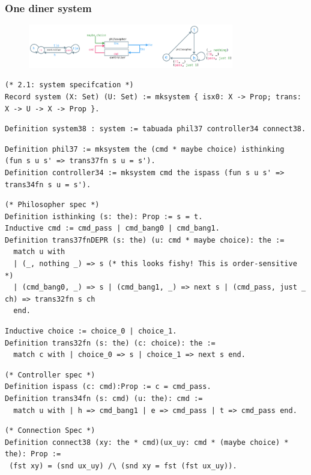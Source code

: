 \documentclass{beamer}
\begin{document}
\begin{frame}[fragile]
\frametitle{One diner system}

\begin{figure}\centering
\includegraphics[width=0.8\textwidth]{transitions-combined.png}
\end{figure}
\pause
{\tiny
\begin{verbatim}
(* 2.1: system specifcation *)
Record system (X: Set) (U: Set) := mksystem { isx0: X -> Prop; trans: X -> U -> X -> Prop }.
\end{verbatim}
\pause
\begin{verbatim}
Definition system38 : system := tabuada phil37 controller34 connect38.
\end{verbatim}
\pause

\begin{verbatim}
Definition phil37 := mksystem the (cmd * maybe choice) isthinking  (fun s u s' => trans37fn s u = s').
Definition controller34 := mksystem cmd the ispass (fun s u s' => trans34fn s u = s').
\end{verbatim}
\pause
\begin{verbatim}
(* Philosopher spec *)
Definition isthinking (s: the): Prop := s = t.
Inductive cmd := cmd_pass | cmd_bang0 | cmd_bang1.
Definition trans37fnDEPR (s: the) (u: cmd * maybe choice): the :=
  match u with
  | (_, nothing _) => s (* this looks fishy! This is order-sensitive *)
  | (cmd_bang0, _) => s | (cmd_bang1, _) => next s | (cmd_pass, just _ ch) => trans32fn s ch
  end.
\end{verbatim}
\pause
\begin{verbatim}
Inductive choice := choice_0 | choice_1.
Definition trans32fn (s: the) (c: choice): the :=
  match c with | choice_0 => s | choice_1 => next s end.
\end{verbatim}

\pause

\begin{verbatim}
(* Controller spec *)
Definition ispass (c: cmd):Prop := c = cmd_pass.
Definition trans34fn (s: cmd) (u: the): cmd :=
  match u with | h => cmd_bang1 | e => cmd_pass | t => cmd_pass end.
\end{verbatim}

\pause
\begin{verbatim}
(* Connection Spec *)
Definition connect38 (xy: the * cmd)(ux_uy: cmd * (maybe choice) * the): Prop := 
 (fst xy) = (snd ux_uy) /\ (snd xy = fst (fst ux_uy)).
\end{verbatim}
}
\end{frame}
\end{document}
